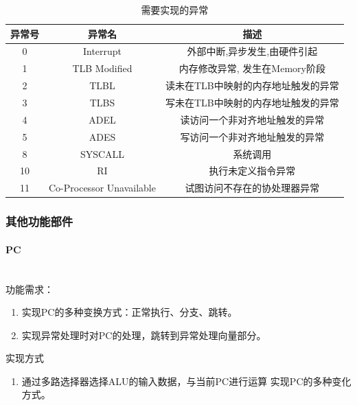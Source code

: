             \begin{table}
            \centering
            \caption{需要实现的异常}
            \begin{tabular}{|c|c|c|}
            \hline
            异常号 & 异常名 & 描述 \\
            \hline
            0 & Interrupt & 外部中断,异步发生,由硬件引起 \\
            \hline
            1 & TLB Modified & 内存修改异常, 发生在Memory阶段 \\
            \hline
            2 & TLBL & 读未在TLB中映射的内存地址触发的异常 \\
            \hline
            3 & TLBS & 写未在TLB中映射的内存地址触发的异常 \\
            \hline
            4 & ADEL　& 读访问一个非对齐地址触发的异常 \\
            \hline
            5 & ADES & 写访问一个非对齐地址触发的异常 \\
            \hline
            8 & SYSCALL & 系统调用 \\
            \hline
            10 & RI & 执行未定义指令异常 \\
            \hline
            11 & Co-Processor Unavailable & 试图访问不存在的协处理器异常 \\
            \hline
            \end{tabular}
            \end{table}

        \subsubsection{其他功能部件}
            \paragraph{PC}
                \mbox{} \\ 

                功能需求：
                \begin{enumerate}
                \item
                实现PC的多种变换方式：正常执行、分支、跳转。
                \item
                实现异常处理时对PC的处理，跳转到异常处理向量部分。
                \end{enumerate}

                实现方式
                \begin{enumerate}
                \item
                通过多路选择器选择ALU的输入数据，与当前PC进行运算%
                实现PC的多种变化方式。
                \end{enumerate}

